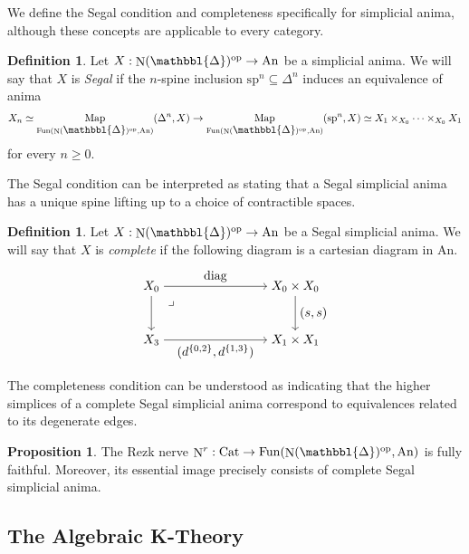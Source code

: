 \documentclass[a4paper,dvipdfmx,11pt,reqno]{amsart}
\DeclareMathOperator{\Map}{Map}
\DeclareMathOperator{\myop}{op}
\DeclareMathOperator{\N}{N}
\DeclareMathOperator{\Fun}{Fun}
\newcommand{\An}{\mathrm{An}}
\newcommand{\Cat}{\mathrm{Cat}}
\newcommand{\prism}{{\mathlarger{\mathbbl{\Delta}}}}
\theoremstyle{definition}
\newtheorem{definition}[theorem]{Definition}
\newtheorem{proposition}[theorem]{Proposition}
\begin{document}
We define the Segal condition and completeness specifically for simplicial anima, although these concepts are applicable to every category.

\begin{definition}
  Let $X : \N(\prism)^{\myop} \to \An$ be a simplicial anima.
  We will say that $X$ is \textit{Segal} if the $n$-spine inclusion $\mathrm{sp}^n \subseteq \Delta^n$ induces an equivalence of anima 
  \begin{align*}
    X_n \simeq \Map_{\Fun(\N(\prism)^{\myop},\An)}(\Delta^n,X) \to \Map_{\Fun(\N(\prism)^{\myop},\An)}(\mathrm{sp}^n,X) \simeq X_1 \times_{X_0} \cdots \times_{X_0} X_1
  \end{align*}
  for every $n \geq 0$.
\end{definition}

The Segal condition can be interpreted as stating that a Segal simplicial anima has a unique spine lifting up to a choice of contractible spaces.

\begin{definition}
  Let $X : \N(\prism)^{\myop} \to \An$ be a Segal simplicial anima.
  We will say that $X$ is \textit{complete} if the following diagram is a cartesian diagram in $\An$.
  \[\begin{tikzpicture}[auto,->] 
    \node (tl) at (0,1.5) {$X_0$}; 
    \node (tr) at (4,1.5) {$X_0 \times X_0$};
    \node (bl) at (0,0) {$X_3$}; 
    \node (br) at (4,0) {$X_1 \times X_1$}; 
    \draw (tl) -- node {$\mathrm{diag}$} (tr); 
    \draw (bl) -- node[swap] {$(d^{\{0,2\}},d^{\{1,3\}})$} (br); 
    \draw (tl) -- node[swap] {} (bl);
    \draw (tr) -- node {$(s,s)$} (br); 
    \node at ([xshift=0.2cm, yshift=-0.2cm] tl.south east) {$\lrcorner$};
  \end{tikzpicture}\]
\end{definition}

The completeness condition can be understood as indicating that the higher simplices of a complete Segal simplicial anima correspond to equivalences related to its degenerate edges.

\begin{proposition}
  The Rezk nerve $\N^r : \Cat \to \Fun(\N(\prism)^{\myop},\An)$ is fully faithful.
  Moreover, its essential image precisely consists of complete Segal simplicial anima.
\end{proposition}

\subsection{The Algebraic K-Theory}
\end{document}
